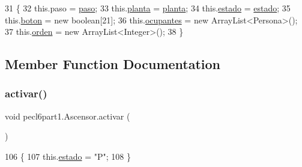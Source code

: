\begin{DoxyCode}
31     \{
32         this.paso = \mbox{\hyperlink{classpecl6part1_1_1_ascensor_ae7416511a25816c86095a3f91915af06}{paso}};
33         this.\mbox{\hyperlink{classpecl6part1_1_1_ascensor_a580b836287ba07c6658c03a5e35fbbdb}{planta}} = \mbox{\hyperlink{classpecl6part1_1_1_ascensor_a580b836287ba07c6658c03a5e35fbbdb}{planta}};
34         this.\mbox{\hyperlink{classpecl6part1_1_1_ascensor_ad892045a12a5bfbd5b352fede74a1d0f}{estado}} = \mbox{\hyperlink{classpecl6part1_1_1_ascensor_ad892045a12a5bfbd5b352fede74a1d0f}{estado}};
35         this.\mbox{\hyperlink{classpecl6part1_1_1_ascensor_a776f98d552b3308c91b998534f1babc0}{boton}} = \textcolor{keyword}{new} \textcolor{keywordtype}{boolean}[21];
36         this.\mbox{\hyperlink{classpecl6part1_1_1_ascensor_aabf71a3bf26b3bff458534e518835c71}{ocupantes}} = \textcolor{keyword}{new} ArrayList<Persona>();
37         this.\mbox{\hyperlink{classpecl6part1_1_1_ascensor_adbe3c1b625d285b4b5011ef0235f3c9f}{orden}} = \textcolor{keyword}{new} ArrayList<Integer>();
38     \}
\end{DoxyCode}


\subsection{Member Function Documentation}
\mbox{\label{classpecl6part1_1_1_ascensor_ae9ae214924705efc2467f8318d8127d9}} 
\subsubsection{\texorpdfstring{activar()}{activar()}}
{\footnotesize\ttfamily void pecl6part1.\+Ascensor.\+activar (\begin{DoxyParamCaption}{ }\end{DoxyParamCaption})\hspace{0.3cm}{\ttfamily [inline]}}


\begin{DoxyCode}
106     \{
107         this.\mbox{\hyperlink{classpecl6part1_1_1_ascensor_ad892045a12a5bfbd5b352fede74a1d0f}{estado}} = \textcolor{stringliteral}{"P"};
108     \}
\end{DoxyCode}
\mbox{\label{classpecl6part1_1_1_ascensor_acb83d6d5b2a100ea201f54e332476cda}} 
